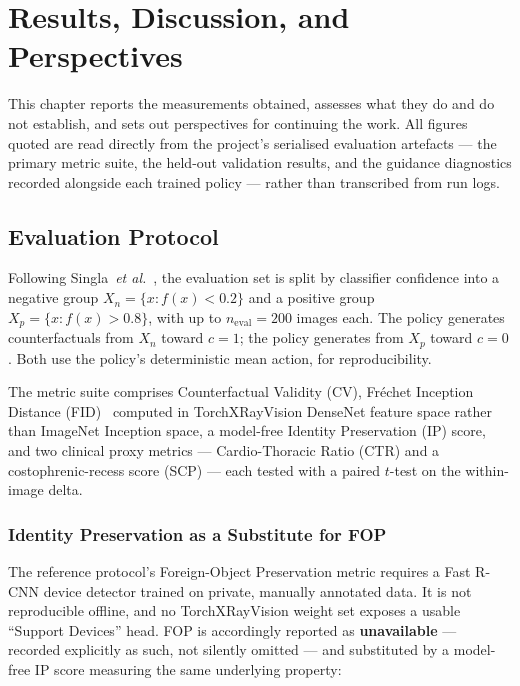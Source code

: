 \chapter{Results, Discussion, and Perspectives}
\label{ch:results}

This chapter reports the measurements obtained, assesses what they do and
do not establish, and sets out perspectives for continuing the work. All
figures quoted are read directly from the project's serialised evaluation
artefacts --- the primary metric suite, the held-out validation results,
and the guidance diagnostics recorded alongside each trained policy ---
rather than transcribed from run logs.

\section{Evaluation Protocol}

Following Singla~\emph{et al.}~\cite{singla2022}, the evaluation set is
split by classifier confidence into a negative group
$X_n = \{x : f(x) < 0.2\}$ and a positive group
$X_p = \{x : f(x) > 0.8\}$, with up to $n_{\text{eval}} = 200$ images
each. The \ntop{} policy generates counterfactuals from $X_n$ toward
$c=1$; the \pton{} policy generates from $X_p$ toward $c=0$. Both use the
policy's deterministic mean action, for reproducibility.

The metric suite comprises Counterfactual Validity (CV), Fr\'echet
Inception Distance (FID)~\cite{heusel2017fid} computed in
TorchXRayVision DenseNet feature space rather than ImageNet Inception
space, a model-free Identity Preservation (IP) score, and two clinical
proxy metrics --- Cardio-Thoracic Ratio (CTR) and a costophrenic-recess
score (SCP) --- each tested with a paired $t$-test on the within-image
delta.

\subsection{Identity Preservation as a Substitute for FOP}

The reference protocol's Foreign-Object Preservation metric requires a
Fast R-CNN device detector trained on private, manually annotated data.
It is not reproducible offline, and no TorchXRayVision weight set exposes
a usable ``Support Devices'' head. FOP is accordingly reported as
\textbf{unavailable} --- recorded explicitly as such, not silently
omitted --- and substituted by a model-free IP score measuring the same
underlying property:

